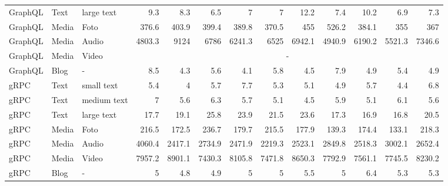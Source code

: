 \begin{table}[p]
{\begin{tabular}{|l|l|l|*{10}{r}|}
					GraphQL & Text & large text  & 9.3 & 8.3 & 6.5 & 7 & 7 & 12.2 & 7.4 & 10.2 & 6.9 & 7.3 \\
					GraphQL & Media & Foto       & 376.6 & 403.9 & 399.4 & 389.8 & 370.5 & 455 & 526.2 & 384.1 & 355 & 367 \\
					GraphQL & Media & Audio      & 4803.3 & 9124 & 6786 & 6241.3 & 6525 & 6942.1 & 4940.9 & 6190.2 & 5521.3 & 7346.6 \\
					GraphQL & Media & Video      & \multicolumn{10}{c|}{-} \\
					GraphQL & Blog  & -          & 8.5 & 4.3 & 5.6 & 4.1 & 5.8 & 4.5 & 7.9 & 4.9 & 5.4 & 4.9 \\
					gRPC & Text & small text     & 5.4 & 4 & 5.7 & 7.7 & 5.3 & 5.1 & 4.9 & 5.7 & 4.4 & 6.8 \\
					gRPC & Text & medium text    & 7 & 5.6 & 6.3 & 5.7 & 5.1 & 4.5 & 5.9 & 5.1 & 6.1 & 5.6 \\
					gRPC & Text & large text     & 17.7 & 19.1 & 25.8 & 23.9 & 21.5 & 23.6 & 17.3 & 16.9 & 16.8 & 20.5 \\
					gRPC & Media & Foto          & 216.5 & 172.5 & 236.7 & 179.7 & 215.5 & 177.9 & 139.3 & 174.4 & 133.1 & 218.3 \\
					gRPC & Media & Audio         & 4060.4 & 2417.1 & 2734.9 & 2471.9 & 2219.3 & 2523.1 & 2849.8 & 2518.3 & 3002.1 & 2652.4 \\
					gRPC & Media & Video         & 7957.2 & 8901.1 & 7430.3 & 8105.8 & 7471.8 & 8650.3 & 7792.9 & 7561.1 & 7745.5 & 8230.2 \\
					gRPC & Blog  & -             & 5 & 4.8 & 4.9 & 5 & 5 & 5.5 & 5 & 6.4 & 5.3 & 5.3 \\
					\hline
			\end{tabular}}
		\end{table}
	


